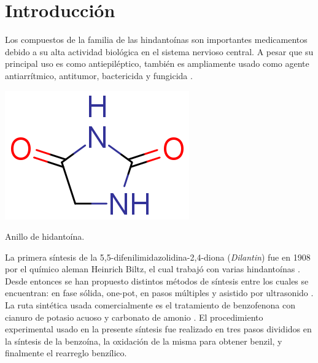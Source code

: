\documentclass[fleqn,10pt]{SelfArx}
\begin{document}
\flushbottom %

\maketitle %


\thispagestyle{empty} %




\section*{Introducci\'on} %
Los compuestos de la familia de las hindanto\'inas son importantes medicamentos debido a su alta actividad biol\'ogica en el sistema nervioso central. A pesar que su principal uso es como antiepil\'eptico, tambi\'en es ampliamente usado como agente antiarr\'itmico, antitumor, bactericida y fungicida \cite{safari2010}\cite{ildiz2012}\cite{hayward1983}.
\begin{scheme}[h]
	\centering
	\includegraphics[width=0.3\linewidth]{structures/hydantoin.png}
	\caption{Anillo de hidanto\'ina.}
\end{scheme}

La primera s\'intesis de la 5,5-difenilimidazolidina-2,4-diona (\textit{Dilantin}) fue en 1908 por el qu\'imico aleman Heinrich Biltz, el cual trabaj\'o con varias hindanto\'inas \cite{hayward1983}\cite{aicardi2007}. Desde entonces se han propuesto distintos m\'etodos de s\'intesis entre los cuales se encuentran: en fase s\'olida, one-pot, en pasos m\'ultiples y asistido por ultrasonido \cite{safari2010}. La ruta sint\'etica usada comercialmente es el tratamiento de benzofenona con cianuro de potasio acuoso y carbonato de amonio \cite{hayward1983}. El procedimiento experimental usado en la presente s\'intesis fue realizado en tres pasos divididos en la s\'intesis de la benzo\'ina, la oxidaci\'on de la misma para obtener benzil, y finalmente el rearreglo benz\'ilico.
\end{document}
